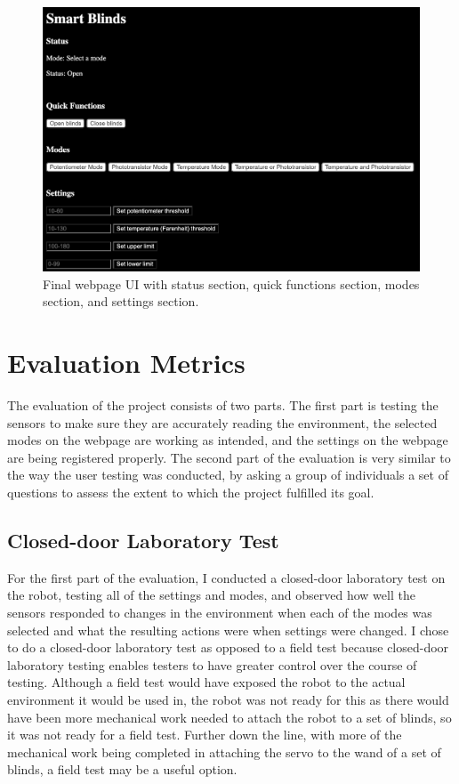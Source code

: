 \documentclass[10pt,twocolumn]{article}
\begin{document}
\begin{figure}
    \centering
    \includegraphics[width=.95\linewidth]{Figure 8.png}
    \caption{
        Final webpage UI with status section, quick functions section, modes section, and settings section.
    }
    \label{fig:fig8}
\end{figure}

\section{Evaluation Metrics}
The evaluation of the project consists of two parts. The first part is testing the sensors to make sure they are accurately reading the environment, the selected modes on the webpage are working as intended, and the settings on the webpage are being registered properly.  The second part of the evaluation is very similar to the way the user testing was conducted, by asking a group of individuals a set of questions to assess the extent to which the project fulfilled its goal.

\subsection{Closed-door Laboratory Test}
For the first part of the evaluation, I conducted a closed-door laboratory test on the robot, testing all of the settings and modes, and observed how well the sensors responded to changes in the environment when each of the modes was selected and what the resulting actions were when settings were changed. I chose to do a closed-door laboratory test as opposed to a field test because closed-door laboratory testing enables testers to have greater control over the course of testing\cite{Tan2016HCI}. Although a field test would have exposed the robot to the actual environment it would be used in, the robot was not ready for this as there would have been more mechanical work needed to attach the robot to a set of blinds, so it was not ready for a field test. Further down the line, with more of the mechanical work being completed in attaching the servo to the wand of a set of blinds, a field test may be a useful option.
\end{document}
